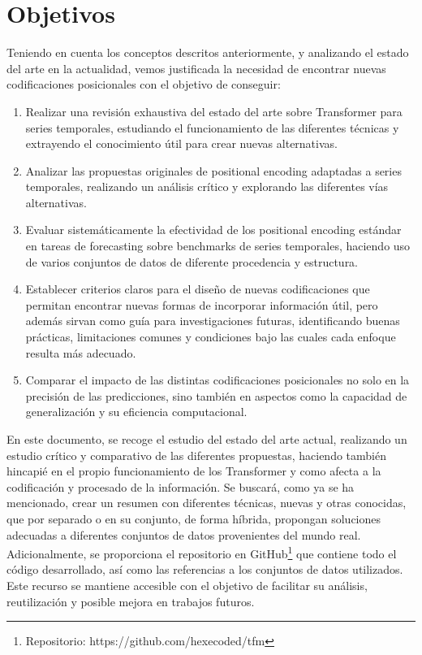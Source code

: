\section{Objetivos}

Teniendo en cuenta los conceptos descritos anteriormente, y analizando el estado del arte en la actualidad, vemos justificada la necesidad de encontrar nuevas codificaciones posicionales con el objetivo de conseguir:

\begin{enumerate}
	\item Realizar una revisión exhaustiva del estado del arte sobre Transformer para series temporales, estudiando el funcionamiento de las diferentes técnicas y extrayendo el conocimiento útil para crear nuevas alternativas.
	
	\item Analizar las propuestas originales de positional encoding adaptadas a series temporales, realizando un análisis crítico y explorando las diferentes vías alternativas.
	
	\item Evaluar sistemáticamente la efectividad de los positional encoding estándar en tareas de forecasting sobre benchmarks de series temporales, haciendo uso de varios conjuntos de datos de diferente procedencia y estructura.
	
	\item Establecer criterios claros para el diseño de nuevas codificaciones que permitan encontrar nuevas formas de incorporar información útil, pero además sirvan como guía para investigaciones futuras, identificando buenas prácticas, limitaciones comunes y condiciones bajo las cuales cada enfoque resulta más adecuado.
	
	\item Comparar el impacto de las distintas codificaciones posicionales no solo en la precisión de las predicciones, sino también en aspectos como la capacidad de generalización y su eficiencia computacional.

\end{enumerate}

En este documento, se recoge el estudio del estado del arte actual, realizando un estudio crítico y comparativo de las diferentes propuestas, haciendo también hincapié en el propio funcionamiento de los Transformer y como afecta a la codificación y procesado de la información. Se buscará, como ya se ha mencionado, crear un resumen con diferentes técnicas, nuevas y otras conocidas, que por separado o en su conjunto, de forma híbrida, propongan soluciones adecuadas a diferentes conjuntos de datos provenientes del mundo real.\\

Adicionalmente, se proporciona el repositorio en GitHub\footnote{Repositorio: https://github.com/hexecoded/tfm} que contiene todo el código desarrollado, así como las referencias a los conjuntos de datos utilizados. Este recurso se mantiene accesible con el objetivo de facilitar su análisis, reutilización y posible mejora en trabajos futuros.